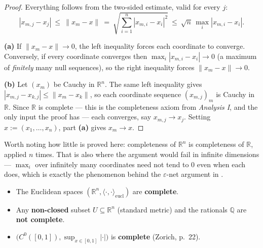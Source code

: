 \begin{proof}
Everything follows from the two-sided estimate, valid for every $j$:
\[|x_{m,j}-x_j| \ \leq\ \lVert x_m-x\rVert \ =\ \sqrt{\sum_{i=1}^n|x_{m,i}-x_i|^2}
  \ \leq\ \sqrt{n}\,\max_i|x_{m,i}-x_i|.\]

\textbf{(a)} If $\lVert x_m-x\rVert \to 0$, the left inequality forces each coordinate to
converge. Conversely, if every coordinate converges then $\max_i|x_{m,i}-x_i| \to 0$ (a maximum
of \emph{finitely} many null sequences), so the right inequality forces
$\lVert x_m - x\rVert \to 0$.

\textbf{(b)} Let $(x_m)$ be Cauchy in $\mathbb{R}^n$. The same left inequality gives
$|x_{m,j}-x_{k,j}| \leq \lVert x_m-x_k\rVert$, so each coordinate sequence $(x_{m,j})_m$ is
Cauchy in $\mathbb{R}$. Since $\mathbb{R}$ is complete --- this is the completeness axiom from
\emph{Analysis I}, and the only input the proof has --- each converges, say
$x_{m,j} \to x_j$. Setting $x := (x_1,\dots,x_n)$, part \textbf{(a)} gives $x_m \to x$.
\end{proof}

\begin{ainote}
Worth noting how little is proved here: completeness of $\mathbb{R}^n$ is completeness of
$\mathbb{R}$, applied $n$ times. That is also where the argument would fail in infinite
dimensions --- $\max_i$ over infinitely many coordinates need not tend to $0$ even when each
does, which is exactly the phenomenon behind the $\varepsilon$-net argument in
.
\end{ainote}

\begin{example}
\begin{itemize}
  \item The Euclidean spaces $(\mathbb{R}^n, \langle\cdot,\cdot\rangle_{\text{eucl}})$ are
    \textbf{complete}.
  \item Any \textbf{non-closed} subset $U \subseteq \mathbb{R}^n$ (standard metric) and the
    rationals $\mathbb{Q}$ are \textbf{not complete}.
  \item $\big(C^0([0,1]), \sup_{x \in [0,1]}|\cdot|\big)$ is \textbf{complete} (Zorich, p.\ 22).
\end{itemize}
\end{example}

